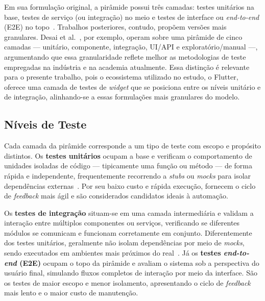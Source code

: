 \documentclass[12pt]{article}
\begin{document}
Em sua formulação original, a pirâmide possui três camadas: testes unitários
na base, testes de serviço (ou integração) no meio e testes de interface ou
\textit{end-to-end} (E2E) no topo~\cite{cohn2009}. Trabalhos posteriores,
contudo, propõem versões mais granulares. Desai et al.~\cite{desai2025testpyramid}, por
exemplo, operam sobre uma pirâmide de cinco camadas --- unitário,
componente, integração, UI/API e exploratório/manual ---, argumentando que
essa granularidade reflete melhor as metodologias de teste empregadas na
indústria e na academia atualmente. Essa distinção é relevante para o
presente trabalho, pois o ecossistema utilizado no estudo, o Flutter,
oferece uma camada de testes de \textit{widget} que se posiciona entre os
níveis unitário e de integração, alinhando-se a essas formulações mais
granulares do modelo.

\subsection{Níveis de Teste}
\label{subsec:niveis}

Cada camada da pirâmide corresponde a um tipo de teste com escopo e propósito
distintos. Os \textbf{testes unitários} ocupam a base e verificam o
comportamento de unidades isoladas de código --- tipicamente uma função ou
método --- de forma rápida e independente, frequentemente recorrendo a
\textit{stubs} ou \textit{mocks} para isolar dependências
externas~\cite{desai2025testpyramid}. Por seu baixo custo e rápida execução,
fornecem o ciclo de \textit{feedback} mais ágil e são considerados
candidatos ideais à automação.

Os \textbf{testes de integração} situam-se em uma camada intermediária e
validam a interação entre múltiplos componentes ou serviços, verificando se
diferentes módulos se comunicam e funcionam corretamente em conjunto.
Diferentemente dos testes unitários, geralmente não isolam dependências por
meio de \textit{mocks}, sendo executados em ambientes mais próximos do
real~\cite{desai2025testpyramid}. Já os \textbf{testes
\textit{end-to-end} (E2E)} ocupam o topo da pirâmide e avaliam o sistema sob
a perspectiva do usuário final, simulando fluxos completos de interação por
meio da interface. São os testes de maior escopo e menor isolamento,
apresentando o ciclo de \textit{feedback} mais lento e o maior custo de
manutenção.
\end{document}
